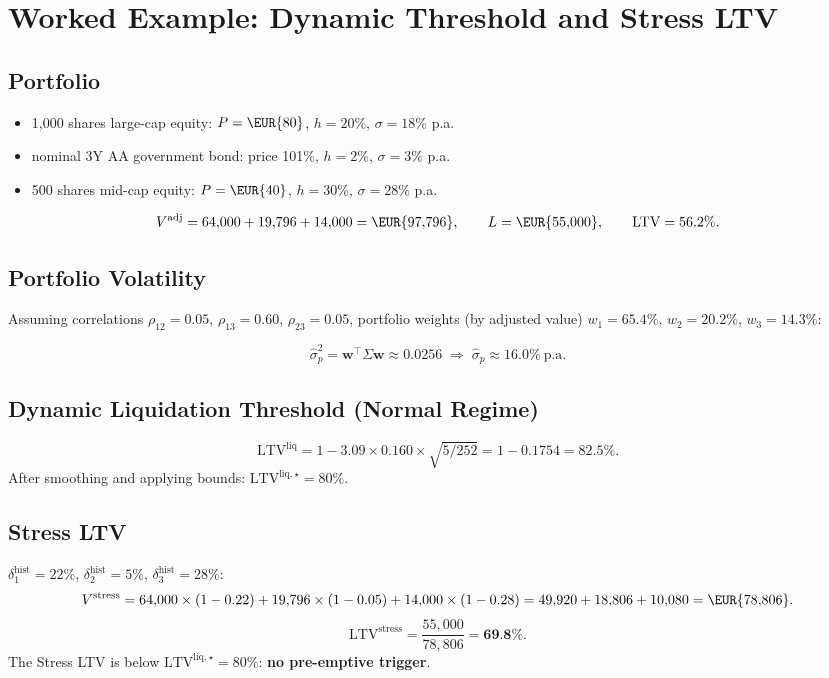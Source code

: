 \documentclass[12pt, a4paper]{article}
\newcommand{\LTV}{\mathrm{LTV}}
\newcommand{\1}{\mathbbm{1}}
\begin{document}
\section{Worked Example: Dynamic Threshold and Stress LTV}
\label{app:example}

\subsection*{Portfolio}

\begin{itemize}[leftmargin=1.5em]
    \item 1,000 shares large-cap equity: $P = \EUR{80}$, $h = 20\%$, $\sigma = 18\%$ p.a.
    \item {} nominal 3Y AA government bond: price 101\%, $h = 2\%$, $\sigma = 3\%$ p.a.
    \item 500 shares mid-cap equity: $P = \EUR{40}$, $h = 30\%$, $\sigma = 28\%$ p.a.
\end{itemize}

\[
V^{\mathrm{adj}} = 64{,}000 + 19{,}796 + 14{,}000 = \EUR{97{,}796},
\qquad L = \EUR{55{,}000},
\qquad \LTV = 56.2\%.
\]

\subsection*{Portfolio Volatility}
Assuming correlations $\rho_{12} = 0.05$, $\rho_{13} = 0.60$, $\rho_{23} = 0.05$,
portfolio weights (by adjusted value) $w_1 = 65.4\%$, $w_2 = 20.2\%$,
$w_3 = 14.3\%$:

\[
\hat{\sigma}_p^2 = \mathbf{w}^\top \Sigma \mathbf{w} \approx 0.0256
\;\Rightarrow\; \hat{\sigma}_p \approx 16.0\%\ \text{p.a.}
\]

\subsection*{Dynamic Liquidation Threshold (Normal Regime)}
\[
\LTV^{\mathrm{liq}} = 1 - 3.09 \times 0.160 \times \sqrt{5/252}
= 1 - 0.1754 = 82.5\%.
\]
After smoothing and applying bounds: $\LTV^{\mathrm{liq},\star} = 80\%$.

\subsection*{Stress LTV}
$\delta_1^{\mathrm{hist}} = 22\%$, $\delta_2^{\mathrm{hist}} = 5\%$,
$\delta_3^{\mathrm{hist}} = 28\%$:
\[
V^{\mathrm{stress}}
= 64{,}000 \times (1-0.22) + 19{,}796 \times (1-0.05) + 14{,}000 \times (1-0.28)
= 49{,}920 + 18{,}806 + 10{,}080
= \EUR{78{,}806}.
\]
\[
\LTV^{\mathrm{stress}} = \frac{55{,}000}{78{,}806} = \textbf{69.8\%}.
\]
The Stress LTV is below $\LTV^{\mathrm{liq},\star} = 80\%$: \textbf{no pre-emptive trigger}.
\end{document}
